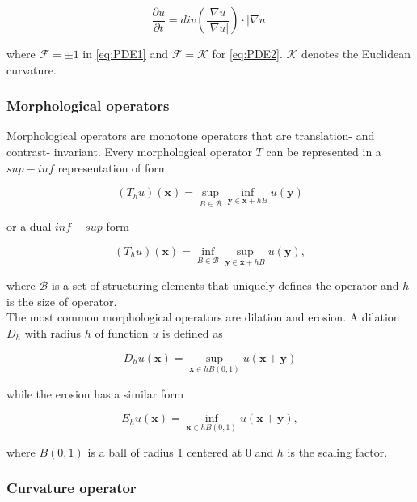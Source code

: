 \begin{equation}
	\frac{\partial u}{\partial t} = div \left ( \frac{\nabla u}{|\nabla u|}  \right ) \cdot |\nabla u|
	\label{eq:PDE2}
\end{equation}

where $\mathcal{F} = \pm 1$ in \ref{eq:PDE1} and $\mathcal{F} = \mathcal{K}$ for \ref{eq:PDE2}. $\mathcal{K}$ denotes the Euclidean curvature.



\subsubsection{Morphological operators} 

Morphological operators are monotone operators that are translation- and contrast- invariant. Every morphological operator $T$ can be represented in a $sup-inf$ representation of form 

\begin{equation}
	(T_hu)(\mathbf{x}) = \sup_{B \in \mathcal{B}} \inf_{\mathbf{y} \in \mathbf{x} + hB}u(\mathbf{y})
\end{equation}

or a dual $inf-sup$ form

\begin{equation}
	(T_hu)(\mathbf{x}) = \inf_{B \in \mathcal{B}} \sup_{\mathbf{y} \in \mathbf{x} + hB}u(\mathbf{y}),
\end{equation}

where $\mathcal{B}$ is a set of structuring elements that uniquely defines the operator and $h$ is the size of operator. \\

The most common morphological operators are dilation and erosion. A dilation $D_h$ with radius $h$ of function $u$ is defined as 

\begin{equation}
	D_hu(\mathbf{x}) = \sup_{\mathbf{x} \in hB(0,1)} u(\mathbf{x} + \mathbf{y})
\end{equation}

while the erosion has a similar form

\begin{equation}
	E_hu(\mathbf{x}) = \inf_{\mathbf{x} \in hB(0,1)} u(\mathbf{x} + \mathbf{y}),
\end{equation}

 where $B(0,1)$ is a ball of radius 1 centered at 0 and $h$ is the scaling factor.
 
\subsubsection{Curvature operator}

